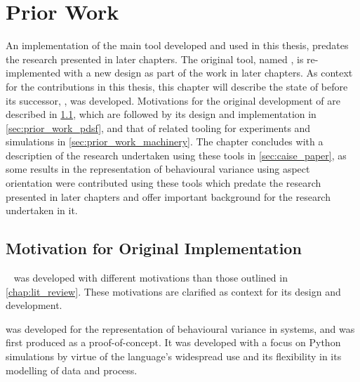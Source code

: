 \chapter{Prior Work}\label{chap:prior_work}


An implementation of the main tool developed and used in this thesis, predates
the research presented in later chapters. The original tool, named \pydysofu{},
is re-implemented with a new design as part of the work in later chapters. As
context for the contributions in this thesis, this chapter will describe the
state of \pydysofu{} before its successor, \pdsfthree, was developed.
Motivations for the original development of \pydysofu are described in
\cref{sec:pdsf_motivations}, which are followed by its design and implementation
in \cref{sec:prior_work_pdsf}, and that of related tooling for experiments and
simulations in \cref{sec:prior_work_machinery}. The chapter concludes with a
descriptien of the research undertaken using these tools in
\cref{sec:caise_paper}, as some results in the representation of behavioural
variance using aspect orientation were contributed using these tools which
predate the research presented in later chapters and offer important background
for the research undertaken in it.

\section{Motivation for Original Implementation}
\label{sec:pdsf_motivations}

\pydysofu{}~\cite{wallis2018caise} was developed with
different motivations than those outlined in \cref{chap:lit_review}. These
motivations are clarified as context for its design and
development.

\pydysofu{} was developed for the representation of behavioural variance in
\sociotechnical systems, and was first produced as a proof-of-concept. It was
developed with a focus on Python simulations by virtue of the language's
widespread use and its flexibility in its modelling of data and process.

